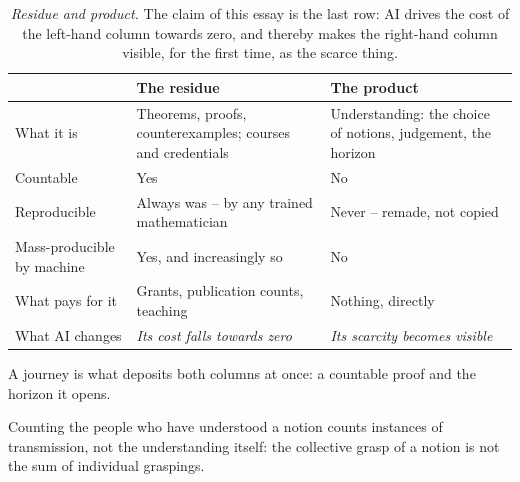\documentclass[11pt, a4paper,twosided]{amsart}
\begin{document}
\begin{table}[t]
\begin{threeparttable}
\caption{\emph{Residue and product.} The claim of this essay is the last row: AI drives the cost of the left-hand column towards zero, and thereby makes the right-hand column visible, for the first time, as the scarce thing.}
\label{tab:residue}
\small
\renewcommand{\arraystretch}{1.25}
\begin{tabular}{@{}>{\raggedright\arraybackslash\ttfamily}p{3cm}%
                  >{\raggedright\arraybackslash}p{5cm}%
                  >{\raggedright\arraybackslash}p{4.9cm}@{}}
\toprule
 & \textbf{The residue} & \textbf{The product} \\
\midrule
What it is
  & Theorems, proofs, counterexamples; courses and credentials\tnote{a}
  & Understanding: the choice of notions, judgement, the horizon\tnote{a} \\
Countable
  & Yes
  & No \tnote{b}\\
Reproducible
  & Always was -- by any trained mathematician
  & Never -- remade, not copied\\
Mass-producible by machine
  & Yes, and increasingly so
  & No \\
What pays for it
  & Grants, publication counts, teaching
  & Nothing, directly \\
What AI changes
  & \itshape Its cost falls towards zero
  & \itshape Its scarcity becomes visible \\
\bottomrule
\end{tabular}
\begin{tablenotes}
        \item[a] A journey is what deposits both columns at once: a countable proof and the horizon it opens.
        \item[b] Counting the people who have understood a notion counts instances of transmission, not the understanding itself: the collective grasp of a notion is not the sum of individual graspings.
    \end{tablenotes}
\end{threeparttable}
\end{table}
\end{document}
